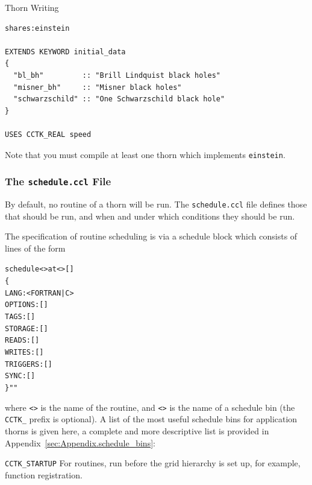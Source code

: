 \begin{cactuspart}{Thorn Writing}
\begin{verbatim}
shares:einstein

EXTENDS KEYWORD initial_data
{
  "bl_bh"         :: "Brill Lindquist black holes"
  "misner_bh"     :: "Misner black holes"
  "schwarzschild" :: "One Schwarzschild black hole"
}

USES CCTK_REAL speed

\end{verbatim}

Note that you must compile at least one thorn which implements \texttt{einstein}.



\subsubsection{The \texttt{schedule.ccl} File}
\label{subsec:schedule_ccl}
By default, no routine of a thorn will be run.  The \texttt{schedule.ccl}
file defines those that should be run, and when and under which
conditions they should be run.

The specification of routine scheduling is via a schedule block which
consists of lines of the form

\begin{alltt}
schedule <> at <> []
\{
  LANG:     <FORTRAN|C>
  OPTIONS:     []
  TAGS:        []
  STORAGE:     []
  READS:       []
  WRITES:      []
  TRIGGERS:    []
  SYNC:        []
\} ""
\end{alltt}
where \texttt{<>} is the name of the routine, and
\texttt{<>} is the name of a schedule bin (the \texttt{CCTK\_}
prefix is optional). A list of the most useful schedule bins for application
thorns is given here, a complete and more descriptive list is provided in
Appendix~\ref{sec:Appendix.schedule_bins}:

\begin{Lentry}

\item [\texttt{CCTK\_STARTUP}]
For routines, run before the grid hierarchy is set up, for example, function
registration.


\end{Lentry}
\end{cactuspart}
